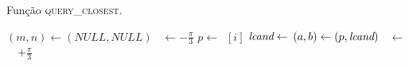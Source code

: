 \begin{algorithm}
    \caption{Função \textsc{query\_closest}.} \label{parestatico:closest}
\begin{algorithmic}[1]
        \State $(m,n) \leftarrow (NULL, NULL)$
        \State \angulo~$\leftarrow -\frac{\pi}{3}$
            \State {} 
                \State $p \leftarrow $~\pontos$[i]$
                \State $\textit{lcand} \leftarrow $ 
                \State {}
                    \State $(a, b) \leftarrow (p, \textit{lcand})$
                \EndIf
            \EndFor
            \State \angulo~$\leftarrow$~\angulo~$ + \frac{\pi}{3}$
            \State {} 
        \EndWhile
        \State {}
    \EndFunction
\end{algorithmic}
\end{algorithm}